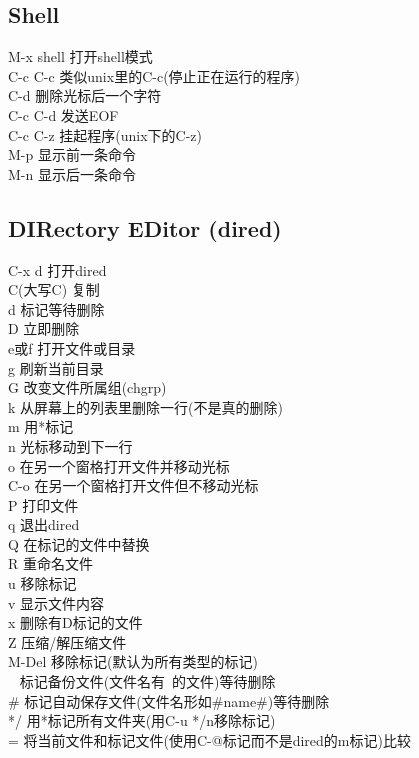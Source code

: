 \documentclass[11pt,a4paper,titlepage]{article}
\begin{document}
{\subsection{Shell}
M-x shell 打开shell模式\\
C-c C-c 类似unix里的C-c(停止正在运行的程序)\\
C-d 删除光标后一个字符\\
C-c C-d 发送EOF\\
C-c C-z 挂起程序(unix下的C-z)\\
M-p 显示前一条命令\\
M-n 显示后一条命令\\

\subsection{DIRectory EDitor (dired)}
C-x d 打开dired\\
C(大写C) 复制\\
d 标记等待删除\\
D 立即删除\\
e或f 打开文件或目录\\
g 刷新当前目录\\
G 改变文件所属组(chgrp)\\
k 从屏幕上的列表里删除一行(不是真的删除)\\
m 用*标记\\
n 光标移动到下一行\\
o 在另一个窗格打开文件并移动光标\\
C-o 在另一个窗格打开文件但不移动光标\\
P 打印文件\\
q 退出dired\\
Q 在标记的文件中替换\\
R 重命名文件\\
u 移除标记\\
v 显示文件内容\\
x 删除有D标记的文件\\
Z 压缩/解压缩文件\\
M-Del 移除标记(默认为所有类型的标记)\\
~ 标记备份文件(文件名有~的文件)等待删除\\
\# 标记自动保存文件(文件名形如\#name\#)等待删除\\
*/ 用*标记所有文件夹(用C-u */n移除标记)\\
= 将当前文件和标记文件(使用C-@标记而不是dired的m标记)比较\\
}
\end{document}
